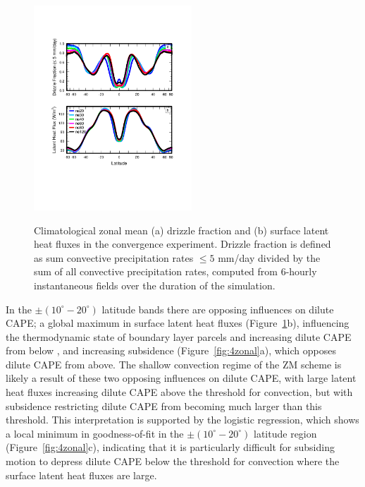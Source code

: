 \documentclass[times]{qjrms4}
\begin{document}
\begin{figure}
\begin{center}
\noindent\includegraphics[width=14pc,angle=0]{figs/temp_2zonal.pdf}\\
\end{center}
\caption{Climatological zonal mean (a) drizzle fraction and (b) surface latent heat fluxes in the convergence experiment. Drizzle fraction is defined as sum  convective precipitation rates $\leq 5$ mm/day divided by the sum of all convective precipitation rates, computed from 6-hourly instantaneous fields over the duration of the simulation.}
\label{fig:2zonal}
\end{figure}

In the $\pm \left(10^{\circ}-20^{\circ} \right)$ latitude bands there are opposing influences on dilute CAPE; a global maximum in surface latent heat fluxes (Figure~\ref{fig:2zonal}b), influencing the thermodynamic state of boundary layer parcels and increasing dilute CAPE from below \citep{Z2002JGR}, and increasing subsidence (Figure~\ref{fig:4zonal}a), which opposes dilute CAPE from above. The shallow convection regime of the ZM scheme is likely a result of these two opposing influences on dilute CAPE, with large latent heat fluxes increasing dilute CAPE above the threshold for convection, but with subsidence restricting dilute CAPE from becoming much larger than this threshold. This interpretation is supported by the logistic regression, which shows a local minimum in goodness-of-fit in the $\pm \left(10^{\circ}-20^{\circ} \right)$ latitude region (Figure~\ref{fig:4zonal}c), indicating that it is particularly difficult for subsiding motion to depress dilute CAPE below the threshold for convection where the surface latent heat fluxes are large.
\end{document}
